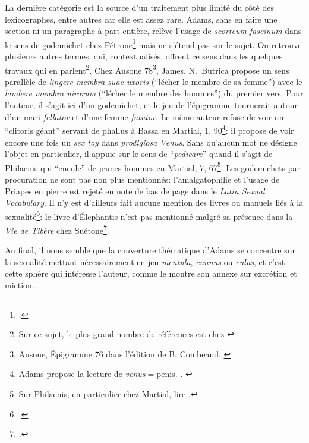 La dernière catégorie est la source d'un traitement plus limité du côté des lexicographes, entre autres car elle est assez rare. Adams, sans en faire une section ni un paragraphe à part entière, relève l'usage de \textit{scorteum fascinum} dans le sens de godemichet chez Pétrone\footcite[p.~63]{adams} mais ne s'étend pas sur le sujet. On retrouve plusieurs autres termes, qui, contextualisés, offrent ce sens dans les quelques travaux qui en parlent\footnote{Sur ce sujet, le plus grand nombre de références est chez \textcite{parker1997teratogenic}}. Chez Ausone 78\footnote{Ausone, Épigramme 76 dans l'édition de B. Combeaud. \textcite[pp.~223-223]{butrica_myths_2005}}, James. N.~Butrica propose un sens parallèle de \textit{lingere membra suae uxoris} (\enquote{lécher le membre de sa femme}) avec le \textit{lambere membra uirorum} (\enquote{lécher le membre des hommes}) du premier vers. Pour l'auteur, il s'agit ici d'un godemichet, et le jeu de l'épigramme tournerait autour d'un mari \textit{fellator} et d'une femme \textit{fututor}. Le même auteur refuse de voir un \enquote{clitoris géant} servant de phallus à Bassa en Martial, 1, 90\footnote{Adams propose la lecture de \textit{venus}$=$penis. \textcite[p.~98]{adams}. \textcite[p.~255]{butrica_myths_2005}}: il propose de voir encore une fois un \textit{sex toy} dans \textit{prodigiosa Venus}. Sans qu'aucun mot ne désigne l'objet en particulier, il appuie sur le sens de \enquote{\textit{pedicare}} quand il s'agit de Philaenis qui \enquote{encule} de jeunes hommes en Martial, 7, 67\footnote{Sur Philaenis, en particulier chez Martial, lire \textcite{boehringer_not_2018}.}. Les godemichets par procuration ne sont pas non plus mentionnés: l'amalgatophilie et l'usage de Priapes en pierre est rejeté en note de bas de page dans le \textit{Latin Sexual Vocabulary}. Il n'y est d'ailleurs fait aucune mention des livres ou manuels liés à la sexualité\footcite[p.185]{puccini_delbey_vie_2010}: le livre d'Élephantis n'est pas mentionné malgré sa présence dans la \textit{Vie de Tibère} chez Suétone\footcite[p.~190]{gladhill_tiberius_2018}.

Au final, il nous semble que la couverture thématique d'Adams se concentre sur la sexualité mettant nécessairement en jeu \textit{mentula}, \textit{cunnus} ou \textit{culus}, et c'est cette sphère qui intéresse l'auteur, comme le montre son annexe sur excrétion et miction.


